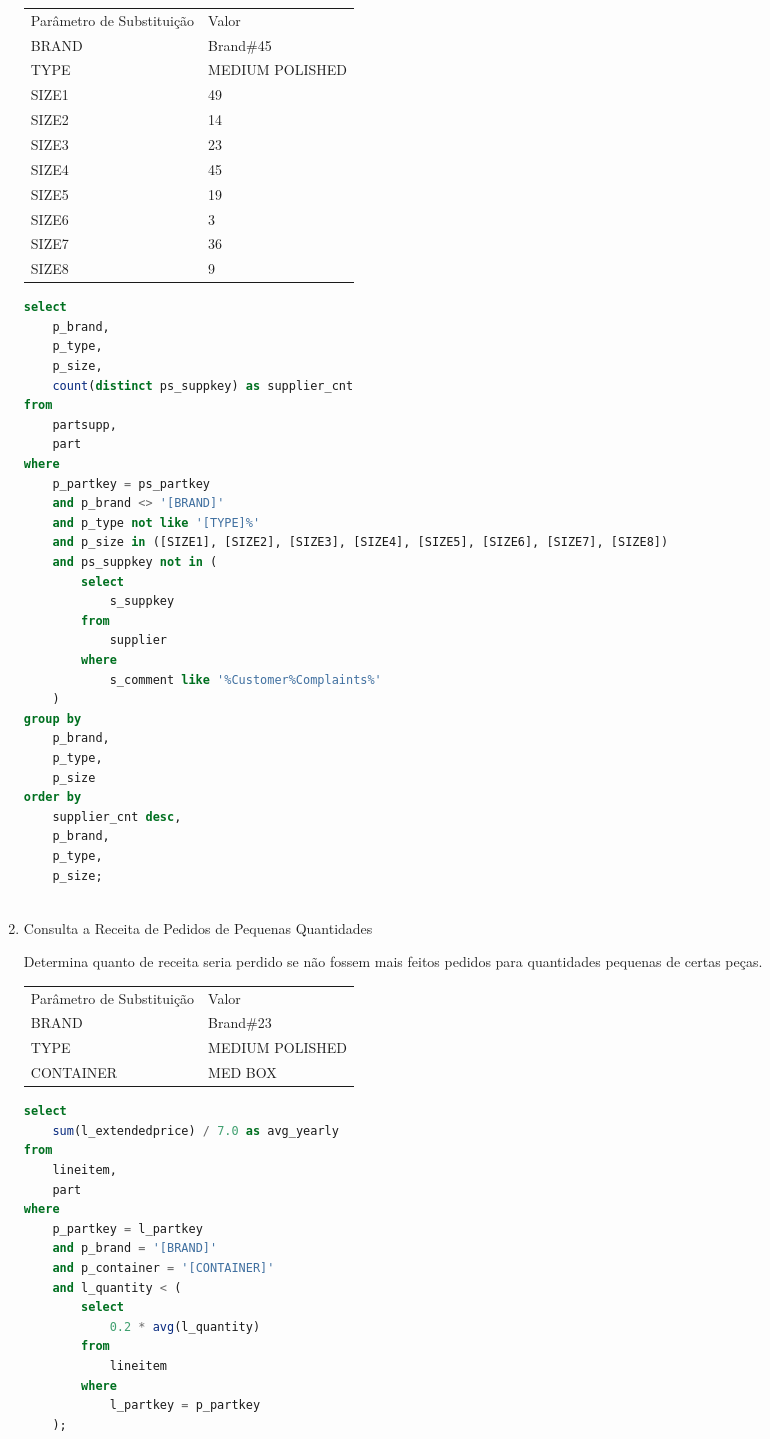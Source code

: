 \begin{enumerate}
\begin{tabular}{ll}
	Parâmetro de Substituição & Valor\\
	BRAND & Brand$\#$45\\
	TYPE & MEDIUM POLISHED \\
	SIZE1 & 49 \\
	SIZE2 & 14 \\
	SIZE3 & 23 \\
	SIZE4 & 45 \\
	SIZE5 & 19 \\
	SIZE6 &  3 \\
	SIZE7 & 36 \\
	SIZE8 &  9 \\
\end{tabular}

	\begin{lstlisting}[language=SQL]
select
	p_brand,
	p_type,
	p_size,
	count(distinct ps_suppkey) as supplier_cnt
from
	partsupp,
	part
where
	p_partkey = ps_partkey
	and p_brand <> '[BRAND]'
	and p_type not like '[TYPE]%'
	and p_size in ([SIZE1], [SIZE2], [SIZE3], [SIZE4], [SIZE5], [SIZE6], [SIZE7], [SIZE8])
	and ps_suppkey not in (
		select
			s_suppkey
		from
			supplier
		where
			s_comment like '%Customer%Complaints%'
	)
group by
	p_brand,
	p_type,
	p_size
order by
	supplier_cnt desc,
	p_brand,
	p_type,
	p_size;
	
	\end{lstlisting}

\item Consulta a Receita de Pedidos de Pequenas Quantidades

Determina quanto de receita seria perdido se não fossem mais feitos pedidos para quantidades pequenas de certas peças.

\begin{tabular}{ll}
	Parâmetro de Substituição & Valor\\
	BRAND & Brand$\#$23\\
	TYPE & MEDIUM POLISHED \\
	CONTAINER & MED BOX \\
\end{tabular}

	\begin{lstlisting}[language=SQL]
select
	sum(l_extendedprice) / 7.0 as avg_yearly
from
	lineitem,
	part
where
	p_partkey = l_partkey
	and p_brand = '[BRAND]'
	and p_container = '[CONTAINER]'
	and l_quantity < (
		select
			0.2 * avg(l_quantity)
		from
			lineitem
		where
			l_partkey = p_partkey
	);
	

\end{lstlisting}
\end{enumerate}
